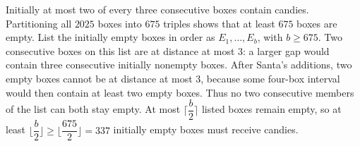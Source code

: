 Initially at most two of every three consecutive boxes contain candies. Partitioning all $2025$ boxes into $675$ triples shows that at least $675$ boxes are empty. List the initially empty boxes in order as $E_1,\ldots,E_b$, with $b\ge675$.
Two consecutive boxes on this list are at distance at most $3$: a larger gap would contain three consecutive initially nonempty boxes. After Santa's additions, two empty boxes cannot be at distance at most $3$, because some four-box interval would then contain at least two empty boxes. Thus no two consecutive members of the list can both stay empty.
At most $\lceil \dfrac{b}{2}\rceil$ listed boxes remain empty, so at least $\lfloor \dfrac{b}{2}\rfloor\ge\lfloor\dfrac{675}{2}\rfloor=\boxed{337}$ initially empty boxes must receive candies.
